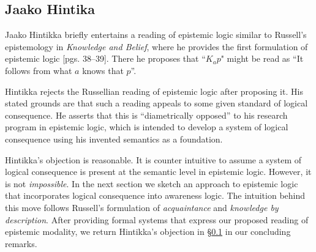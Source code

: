 \subsection{Jaako Hintika}\label{Hintikka}

Jaako Hintikka briefly entertains a reading of
epistemic logic similar to Russell's epistemology 
in \emph{Knowledge and Belief}, where he provides the
first formulation of epistemic logic
\cite{hintikka_knowledge_1969}[pgs. 38--39].  
There he proposes that ``$K_a
p$" might be read as ``It follows from what $a$ knows that $p$''.

Hintikka rejects the Russellian reading of epistemic logic after
proposing it. His stated grounds are that
such a reading appeals to some given standard of logical consequence.  
He asserts that this is ``diametrically opposed'' to his research program in epistemic logic,
which is intended to develop a system of logical consequence using his
invented semantics as a foundation.

Hintikka's objection is reasonable.  It is counter intuitive to assume
a system of logical consequence is present at the semantic level in
epistemic logic.
However, it is not \emph{impossible}.  In the next section we sketch
an approach to epistemic logic that incorporates logical consequence
into awareness logic.  The intuition behind this move follows
Russell's formulation of \emph{acquaintance} and \emph{knowledge by
  description}.  After providing formal systems that express our
proposed reading of epistemic modality, we return Hintikka's objection
in \S\ref{Hintikka} in our concluding remarks.


